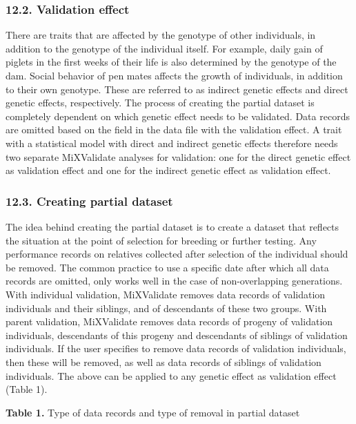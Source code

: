 \subsubsection{12.2. Validation effect}\label{Vali04}

There are traits that are affected by the genotype of other individuals,
in addition to the genotype of the individual itself. For example, daily
gain of piglets in the first weeks of their life is also determined by
the genotype of the dam. Social behavior of pen mates affects the growth
of individuals, in addition to their own genotype. These are referred to
as indirect genetic effects and direct genetic effects, respectively.
The process of creating the partial dataset is completely dependent on
which genetic effect needs to be validated. Data records are omitted
based on the field in the data file with the validation effect. A trait
with a statistical model with direct and indirect genetic effects
therefore needs two separate MiXValidate analyses for validation: one
for the direct genetic effect as validation effect and one for the
indirect genetic effect as validation effect.

\subsubsection{12.3. Creating partial dataset}\label{Vali05}

The idea behind creating the partial dataset is to create a dataset that
reflects the situation at the point of selection for breeding or further
testing. Any performance records on relatives collected after selection
of the individual should be removed. The common practice to use a
specific date after which all data records are omitted, only works well
in the case of non-overlapping generations. With individual validation,
MiXValidate removes data records of validation individuals and their
siblings, and of descendants of these two groups. With parent
validation, MiXValidate removes data records of progeny of validation
individuals, descendants of this progeny and descendants of siblings of
validation individuals. If the user specifies to remove data records of
validation individuals, then these will be removed, as well as data
records of siblings of validation individuals. The above can be applied
to any genetic effect as validation effect (Table 1).

\textbf{Table 1.} Type of data records and type of removal in partial
dataset

